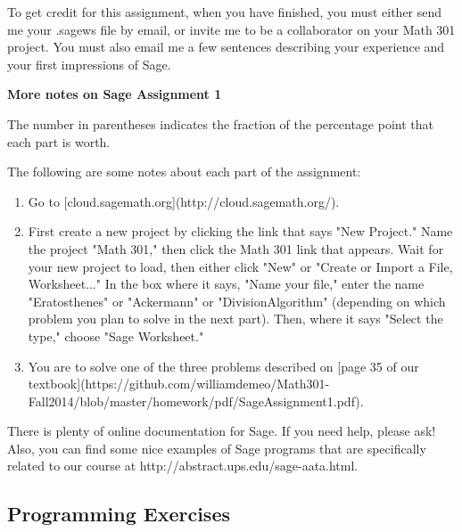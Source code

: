 \documentclass[12pt,reqno]{amsart}
\begin{document}
To get credit for this assignment, when you have finished, you must either send
me your .sagews file by email, or invite me to be a collaborator on your Math 301
project. You must also email me a few sentences describing your experience and
your first impressions of Sage.

{\bf More notes on Sage Assignment 1}

The number in parentheses indicates the fraction of the percentage point that
each part is worth.

The following are some notes about each part of the assignment:

\begin{enumerate}
\item 
Go to [cloud.sagemath.org](http://cloud.sagemath.org/).

\item First create a new project by clicking the link that says "New
   Project."  Name the project "Math 301," then click the Math 301 link that
   appears.  Wait for your new project to load, then either click "New" or
   "Create or Import a File, Worksheet..." In the box where it says, "Name
   your file," enter the name "Eratosthenes" or "Ackermann" or
   "DivisionAlgorithm" (depending on which problem you plan to solve in the next
   part). Then, where it says "Select the type," choose "Sage Worksheet."

\item You are to solve one of the three problems described on
   [page 35 of our textbook](https://github.com/williamdemeo/Math301-Fall2014/blob/master/homework/pdf/SageAssignment1.pdf).
\end{enumerate}

There is plenty of online documentation for Sage. If you need help, please ask!
Also, you can find some nice examples of Sage programs that are specifically
related to our course at http://abstract.ups.edu/sage-aata.html. 

\subsection*{Programming Exercises}
\end{document}
